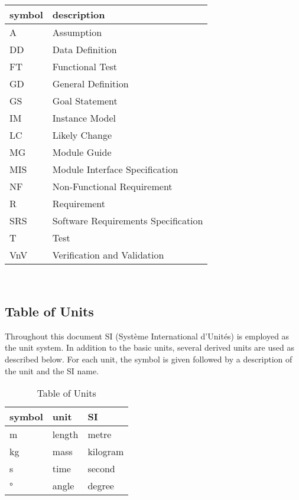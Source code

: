 \documentclass[12pt, titlepage]{article}
\begin{document}
\renewcommand{\arraystretch}{1.2}
\begin{tabular}{l l} 
  \toprule		
  \textbf{symbol} & \textbf{description}\\
  \midrule 
  A & Assumption\\
  DD & Data Definition\\
  FT & Functional Test \\
  GD & General Definition\\
  GS & Goal Statement\\
  IM & Instance Model\\
  LC & Likely Change\\
  MG & Module Guide\\ 
  MIS & Module Interface Specification\\ 
  NF & Non-Functional Requirement\\
  R & Requirement\\
  SRS & Software Requirements Specification\\
  T & Test\\
  VnV & Verification and Validation\\ 
  \bottomrule
\end{tabular}\\

\subsection{Table of Units}

Throughout this document SI (Syst\`{e}me International d'Unit\'{e}s) is
employed as the unit system. In addition to the basic units, several derived
units are
used as described below.  For each unit, the symbol is given followed by a
description of the unit and the SI name.\\

\renewcommand{\arraystretch}{1.2}
\begin{table}[h!]
	\centering
\begin{center}
  \noindent \begin{tabular}{l l l} 
    \toprule		
    \textbf{symbol} & \textbf{unit} & \textbf{SI}\\
    \midrule 
    \si{\metre} & length & metre\\
    \si{\kilogram} & mass & kilogram\\
    \si{\second} & time & second\\
    \si{\degree} & angle & degree\\
    \bottomrule
  \end{tabular}
\end{center}
	\caption{Table of Units}
	\label{Table:R_trace}
\end{table}
\end{document}
